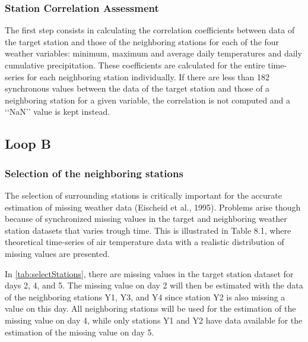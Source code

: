 \documentclass[ARTICLETHERMIC.tex]{subfiles}
\begin{document}
\subsubsection{Station Correlation Assessment}

The first step consists in calculating the correlation coefficients between data of the target station and those of the neighboring stations for each of the four weather variables: minimum, maximum and average daily temperatures and daily cumulative precipitation. These coefficients are calculated for the entire time-series for each neighboring station individually. If there are less than 182 synchronous values between the data of the target station and those of a neighboring station for a given variable, the correlation is not computed and a ‘‘NaN’’ value is kept instead.

\subsection{Loop B}

\subsubsection{Selection of the neighboring stations}


The selection of surrounding stations is critically important for the accurate estimation of missing weather data (Eischeid et al., 1995). Problems arise though because of synchronized missing values in the target and neighboring weather station datasets that varies trough time. This is illustrated in Table 8.1, where theoretical time-series of air temperature data with a realistic distribution of missing values are presented.

In \cref{tab:selectStations}, there are missing values in the target station dataset for days 2, 4, and 5. The missing value on day 2 will then be estimated with the data of the neighboring stations Y1, Y3, and Y4 since station Y2 is also missing a value on this day. All neighboring stations will be used for the estimation of the missing value on day 4, while only stations Y1 and Y2 have data available for the estimation of the missing value on day 5.
\end{document}
